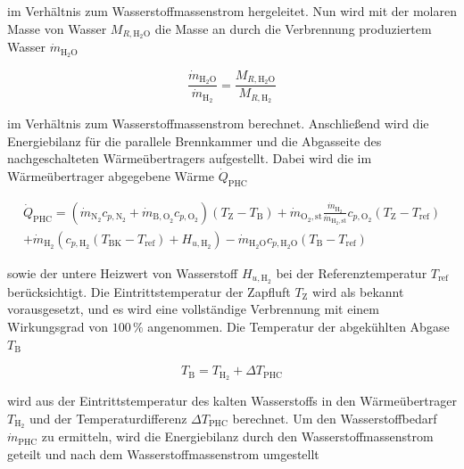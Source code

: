 im Verhältnis zum Wasserstoffmassenstrom hergeleitet. Nun wird mit der molaren Masse von Wasser $M_{R, \mathrm{H}_2\mathrm{O}}$ die Masse an durch die Verbrennung produziertem Wasser $\dot{m}_{\mathrm{H}_2\mathrm{O}}$

\begin{equation}\label{Eq:water}
	\frac{\dot{m}_{\mathrm{H}_2\mathrm{O}}}{\dot{m}_{\mathrm{H}_2}}=\frac{M_{R,\mathrm{H}_2\mathrm{O}}}{M_{R,\mathrm{H}_2}}
\end{equation}

im Verhältnis zum Wasserstoffmassenstrom berechnet. Anschließend wird die Energiebilanz für die parallele Brennkammer und die Abgasseite des nachgeschalteten Wärmeübertragers aufgestellt. Dabei wird die im Wärmeübertrager abgegebene Wärme $\dot{Q}_{\mathrm{PHC}}$

\begin{equation}\label{Eq:energy-phc}
\begin{multlined}
	\dot{Q}_{\mathrm{PHC}}=(\dot{m}_{\mathrm{N}_2}c_{p,\mathrm{N}_2}+\dot{m}_{\mathrm{B,O}_2}c_{p,\mathrm{O}_2})(T_\mathrm{Z}-T_\mathrm{B})+\dot{m}_{\mathrm{O}_2,\mathrm{st}}\frac{\dot{m}_{\mathrm{H}_2}}{\dot{m}_{\mathrm{H}_2,\mathrm{st}}}c_{p,\mathrm{O}_2}(T_\mathrm{Z}-T_{\mathrm{ref}}) \\
    +\dot{m}_{\mathrm{H}_2}(c_{p,\mathrm{H}_2}(T_{\mathrm{BK}}-T_{\mathrm{ref}})+H_{u,\mathrm{H}_2})-\dot{m}_{\mathrm{H}_2\mathrm{O}}c_{p,\mathrm{H}_2\mathrm{O}}(T_{\mathrm{B}}-T_{\mathrm{ref}})
\end{multlined}
\end{equation}

sowie der untere Heizwert von Wasserstoff $H_{u, \mathrm{H}_2}$ bei der Referenztemperatur $T_{\mathrm{ref}}$ berücksichtigt. Die Eintrittstemperatur der Zapfluft $T_\mathrm{Z}$ wird als bekannt vorausgesetzt, und es wird eine vollständige Verbrennung mit einem Wirkungsgrad von $100\,\%$ angenommen. Die Temperatur der abgekühlten Abgase $T_\mathrm{B}$  

\begin{equation}\label{Eq:deltat}
	T_\mathrm{B} = T_{\mathrm{H}_2}+\Delta T_\mathrm{PHC}
\end{equation}

wird aus der Eintrittstemperatur des kalten Wasserstoffs in den Wärmeübertrager $T_{\mathrm{H}_2}$ und der Temperaturdifferenz $\Delta T_{\mathrm{PHC}}$ berechnet. Um den Wasserstoffbedarf $\dot{m}_{\mathrm{PHC}}$ zu ermitteln, wird die Energiebilanz durch den Wasserstoffmassenstrom geteilt und nach dem Wasserstoffmassenstrom umgestellt

